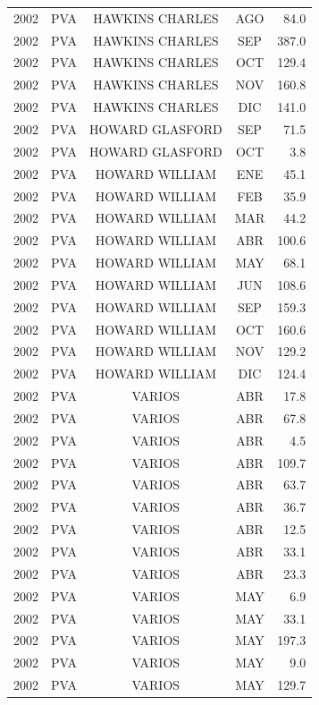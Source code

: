 \documentclass[12pt,]{article}
\begin{document}
\begin{table}[ht]
{\begin{tabular}{lcccr}
  2002 & PVA & HAWKINS CHARLES & AGO & 84.0 \\ 
  2002 & PVA & HAWKINS CHARLES & SEP & 387.0 \\ 
  2002 & PVA & HAWKINS CHARLES & OCT & 129.4 \\ 
  2002 & PVA & HAWKINS CHARLES & NOV & 160.8 \\ 
  2002 & PVA & HAWKINS CHARLES & DIC & 141.0 \\ 
  2002 & PVA & HOWARD GLASFORD & SEP & 71.5 \\ 
  2002 & PVA & HOWARD GLASFORD & OCT & 3.8 \\ 
  2002 & PVA & HOWARD WILLIAM & ENE & 45.1 \\ 
  2002 & PVA & HOWARD WILLIAM & FEB & 35.9 \\ 
  2002 & PVA & HOWARD WILLIAM & MAR & 44.2 \\ 
  2002 & PVA & HOWARD WILLIAM & ABR & 100.6 \\ 
  2002 & PVA & HOWARD WILLIAM & MAY & 68.1 \\ 
  2002 & PVA & HOWARD WILLIAM & JUN & 108.6 \\ 
  2002 & PVA & HOWARD WILLIAM & SEP & 159.3 \\ 
  2002 & PVA & HOWARD WILLIAM & OCT & 160.6 \\ 
  2002 & PVA & HOWARD WILLIAM & NOV & 129.2 \\ 
  2002 & PVA & HOWARD WILLIAM & DIC & 124.4 \\ 
  2002 & PVA & VARIOS & ABR & 17.8 \\ 
  2002 & PVA & VARIOS & ABR & 67.8 \\ 
  2002 & PVA & VARIOS & ABR & 4.5 \\ 
  2002 & PVA & VARIOS & ABR & 109.7 \\ 
  2002 & PVA & VARIOS & ABR & 63.7 \\ 
  2002 & PVA & VARIOS & ABR & 36.7 \\ 
  2002 & PVA & VARIOS & ABR & 12.5 \\ 
  2002 & PVA & VARIOS & ABR & 33.1 \\ 
  2002 & PVA & VARIOS & ABR & 23.3 \\ 
  2002 & PVA & VARIOS & MAY & 6.9 \\ 
  2002 & PVA & VARIOS & MAY & 33.1 \\ 
  2002 & PVA & VARIOS & MAY & 197.3 \\ 
  2002 & PVA & VARIOS & MAY & 9.0 \\ 
  2002 & PVA & VARIOS & MAY & 129.7 \\ 

\end{tabular}}
\end{table}
\end{document}
